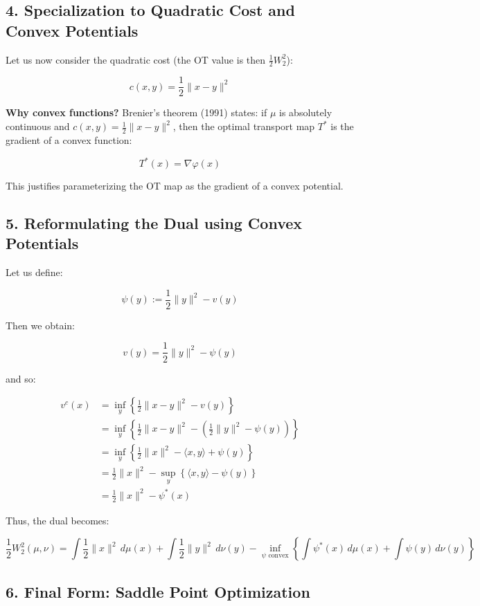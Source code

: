 \documentclass[11pt]{article}
\begin{document}
\subsection*{4. Specialization to Quadratic Cost and Convex Potentials}

Let us now consider the quadratic cost (the OT value is then $\frac{1}{2} W_2^2$):

\[
c(x, y) = \frac{1}{2} \|x - y\|^2
\]

\textbf{Why convex functions?} Brenier's theorem (1991) states: if \(\mu\) is absolutely continuous and \(c(x, y) = \frac{1}{2} \|x - y\|^2\), then the optimal transport map \(T^*\) is the gradient of a convex function:

\[
T^*(x) = \nabla \varphi(x)
\]

This justifies parameterizing the OT map as the gradient of a convex potential.

\subsection*{5. Reformulating the Dual using Convex Potentials}

Let us define:

\[
\psi(y) := \frac{1}{2} \|y\|^2 - v(y)
\]

Then we obtain:

\[
v(y) = \frac{1}{2} \|y\|^2 - \psi(y)
\]

and so:


\[
\begin{aligned}
v^c(x) &= \inf_y \left\{ \frac{1}{2} \|x - y\|^2 - v(y) \right\} \\
&= \inf_y \left\{ \frac{1}{2} \|x - y\|^2 - \left( \frac{1}{2} \|y\|^2 - \psi(y) \right) \right\}\\
&= \inf_y \left\{ \frac{1}{2} \|x\|^2 - \langle x, y \rangle + \psi(y) \right\}\\
&= \frac{1}{2} \|x\|^2 - \sup_y \left\{ \langle x, y \rangle - \psi(y) \right\}\\
&= \frac{1}{2} \|x\|^2 - \psi^*(x)
\end{aligned}
\]

Thus, the dual becomes:

\[
\frac{1}{2} W_2^2(\mu, \nu) = \int \frac{1}{2} \|x\|^2 \, d\mu(x) + \int \frac{1}{2} \|y\|^2 \, d\nu(y) - \inf_{\psi \text{ convex}} \left\{ \int \psi^*(x) \, d\mu(x) + \int \psi(y) \, d\nu(y) \right\}
\]

\subsection*{6. Final Form: Saddle Point Optimization}
\end{document}
